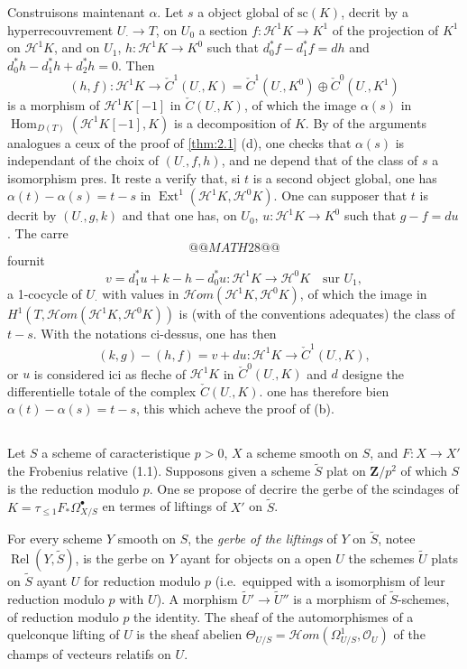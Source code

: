 \documentclass[12pt,a4paper]{article}
\theoremstyle{plain}
\theoremstyle{definition}
\theoremstyle{remark}
\DeclareMathOperator{\Hom}{Hom}
\DeclareMathOperator{\Ext}{Ext}
\DeclareMathOperator{\Rel}{Rel}
\newcommand{\cO}{\mathcal{O}}
\begin{document}
Construisons maintenant $\alpha$. Let $s$ a object global of $\mathrm{sc}(K)$, decrit by a hyperrecouvrement $U_\cdot \to T$, on $U_0$ a section $f: \mathscr{H}^1 K \to K^1$ of the projection of $K^1$ on $\mathscr{H}^1 K$, and on $U_1$, $h: \mathscr{H}^1 K \to K^0$ such that $d_0^* f - d_1^* f = dh$ and $d_0^* h - d_1^* h + d_2^* h = 0$. Then
\[
(h, f): \mathscr{H}^1 K \to \check{C}^1(U_\cdot, K) = \check{C}^1(U_\cdot, K^0) \oplus \check{C}^0(U_\cdot, K^1)
\]
is a morphism of $\mathscr{H}^1 K[-1]$ in $\check{C}(U_\cdot, K)$, of which the image $\alpha(s)$ in $\Hom_{D(T)}(\mathscr{H}^1 K[-1], K)$ is a decomposition of $K$. By of the arguments analogues a ceux of the proof of \ref{thm:2.1} (d), one checks that $\alpha(s)$ is independant of the choix of $(U_\cdot, f, h)$, and ne depend that of the class of $s$ a isomorphism pres. It reste a verify that, si $t$ is a second object global, one has $\alpha(t) - \alpha(s) = t - s$ in $\Ext^1(\mathscr{H}^1 K, \mathscr{H}^0 K)$. One can supposer that $t$ is decrit by $(U_\cdot, g, k)$ and that one has, on $U_0$, $u: \mathscr{H}^1 K \to K^0$ such that $g - f = du$. The carre
\[
@@MATH28@@
\]
fournit
\[
v = d_1^* u + k - h - d_0^* u: \mathscr{H}^1 K \to \mathscr{H}^0 K \quad \text{sur } U_1,
\]
a 1-cocycle of $U_\cdot$ with values in $\mathscr{H}om(\mathscr{H}^1 K, \mathscr{H}^0 K)$, of which the image in $H^1(T, \mathscr{H}om(\mathscr{H}^1 K, \mathscr{H}^0 K))$ is (with of the conventions adequates) the class of $t - s$. With the notations ci-dessus, one has then
\[
(k,g) - (h,f) = v + du: \mathscr{H}^1 K \to \check{C}^1(U_\cdot, K),
\]
or $u$ is considered ici as fleche of $\mathscr{H}^1 K$ in $\check{C}^0(U_\cdot, K)$ and $d$ designe the differentielle totale of the complex $\check{C}(U_\cdot, K)$. one has therefore bien $\alpha(t) - \alpha(s) = t - s$, this which acheve the proof of (b).

\subsection{}

Let $S$ a scheme of caracteristique $p > 0$, $X$ a scheme smooth on $S$, and $F: X \to X'$ the Frobenius relative (1.1). Supposons given a scheme $\tilde{S}$ plat on $\mathbf{Z}/p^2$ of which $S$ is the reduction modulo $p$. One se propose of decrire the gerbe of the scindages of $K = \tau_{\le 1} F_* \Omega^{\bullet}_{X/S}$ en termes of liftings of $X'$ on $\tilde{S}$.

For every scheme $Y$ smooth on $S$, the \emph{gerbe of the liftings} of $Y$ on $\tilde{S}$, notee $\Rel(Y, \tilde{S})$, is the gerbe on $Y$ ayant for objects on a open $U$ the schemes $\tilde{U}$ plats on $\tilde{S}$ ayant $U$ for reduction modulo $p$ (i.e.~equipped with a isomorphism of leur reduction modulo $p$ with $U$). A morphism $\tilde{U}' \to \tilde{U}''$ is a morphism of $\tilde{S}$-schemes, of reduction modulo $p$ the identity. The sheaf of the automorphismes of a quelconque lifting of $U$ is the sheaf abelien $\Theta_{U/S} = \mathscr{H}om(\Omega^1_{U/S}, \cO_U)$ of the champs of vecteurs relatifs on $U$.
\end{document}
